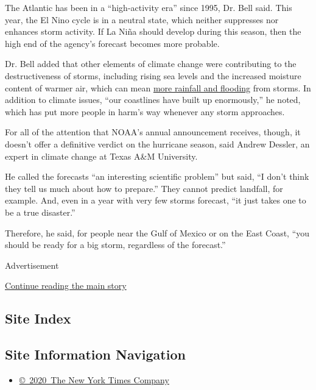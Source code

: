 The Atlantic has been in a ``high-activity era'' since 1995, Dr. Bell
said. This year, the El Nino cycle is in a neutral state, which neither
suppresses nor enhances storm activity. If La Niña should develop during
this season, then the high end of the agency's forecast becomes more
probable.

Dr. Bell added that other elements of climate change were contributing
to the destructiveness of storms, including rising sea levels and the
increased moisture content of warmer air, which can mean
\href{https://www.nytimes.com/2019/07/11/climate/hurricane-tropical-storms.html}{more
rainfall and flooding} from storms. In addition to climate issues, ``our
coastlines have built up enormously,'' he noted, which has put more
people in harm's way whenever any storm approaches.

For all of the attention that NOAA's annual announcement receives,
though, it doesn't offer a definitive verdict on the hurricane season,
said Andrew Dessler, an expert in climate change at Texas A\&M
University.

He called the forecasts ``an interesting scientific problem'' but said,
``I don't think they tell us much about how to prepare.'' They cannot
predict landfall, for example. And, even in a year with very few storms
forecast, ``it just takes one to be a true disaster.''

Therefore, he said, for people near the Gulf of Mexico or on the East
Coast, ``you should be ready for a big storm, regardless of the
forecast.''

Advertisement

\protect\hyperlink{after-bottom}{Continue reading the main story}

\hypertarget{site-index}{%
\subsection{Site Index}\label{site-index}}

\hypertarget{site-information-navigation}{%
\subsection{Site Information
Navigation}\label{site-information-navigation}}

\begin{itemize}
\tightlist
\item
  \href{https://help.nytimes.com/hc/en-us/articles/115014792127-Copyright-notice}{©~2020~The
  New York Times Company}
\end{itemize}

